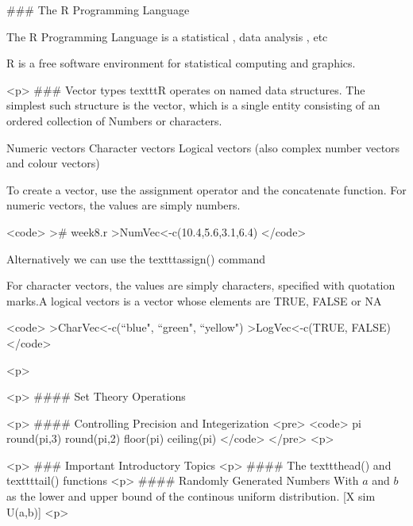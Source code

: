 
### {The R Programming Language}

The R Programming Language is a statistical , data analysis , etc

R is a free software environment for statistical computing and graphics.



<p>
### {Vector types}
texttt{R} operates on named data structures. The simplest such structure is the
vector, which is a single entity consisting of an ordered collection of
Numbers or characters.


Numeric vectors
Character vectors
Logical vectors
(also complex number vectors and colour vectors)


To create a vector, use the assignment operator and the concatenate function.
For numeric vectors, the values are simply numbers.

<code>
># week8.r
>NumVec<-c(10.4,5.6,3.1,6.4)
</code>

Alternatively we can use the texttt{assign()} command

For character vectors, the values are simply characters, specified with
quotation marks.A logical vectors is a vector whose elements are TRUE, FALSE or NA

<code>
>CharVec<-c(``blue", ``green", ``yellow")
>LogVec<-c(TRUE, FALSE)
</code>

<p>







<p>
#### {Set Theory Operations}

<p>
#### {Controlling Precision and Integerization}
<pre>
<code>
pi
round(pi,3)
round(pi,2)
floor(pi)
ceiling(pi)
</code>
</pre>
<p>


<p>
### {Important Introductory Topics}
<p>
#### {The texttt{head()} and texttt{tail()} functions}
<p>
#### {Randomly Generated Numbers}
With $a$ and $b$ as the lower and upper bound of the continous uniform distribution.
[X sim U(a,b)]
<p>
